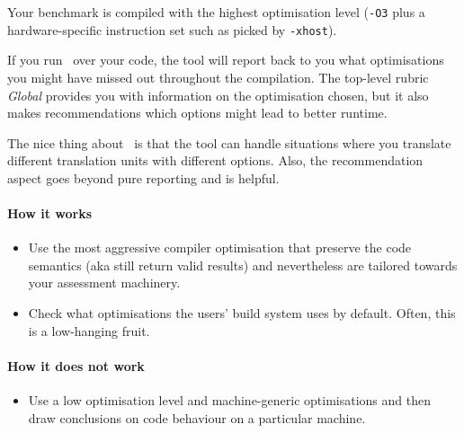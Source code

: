 \begin{checklist}
 \item Your benchmark is compiled with the highest optimisation level (\texttt{-O3} plus a hardware-specific instruction set such as picked by \texttt{-xhost}).
\end{checklist}

\begin{instructions}{\maqao}
 If you run \maqao~over your code, the tool will report back to you what
 optimisations you might have missed out throughout the compilation.
 The top-level rubric \emph{Global} provides you with information on the optimisation chosen, but it also makes recommendations which options might lead to better runtime.
 
 The nice thing about \maqao~is that the tool can handle situations where you translate different translation units with different options.
 Also, the recommendation aspect goes beyond pure reporting and is helpful.
\end{instructions}



\paragraph*{How it works}

\begin{itemize}[noitemsep]
  \item[$\boxplus$] Use the most aggressive compiler optimisation that preserve the code semantics (aka still return valid results) and nevertheless are tailored towards your assessment machinery.
  \item[$\boxplus$] Check what optimisations the users' build system uses by default. Often, this is a low-hanging fruit.
\end{itemize}


\paragraph*{How it does not work}

\begin{itemize}[noitemsep]
  \item[$\boxminus$] Use a low optimisation level and machine-generic optimisations and then draw conclusions on code behaviour on a particular machine. 
\end{itemize}
